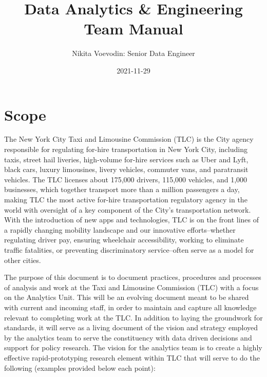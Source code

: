 \documentclass[
]{book}
\title{Data Analytics \& Engineering Team Manual}
\author{Nikita Voevodin: Senior Data Engineer}
\date{2021-11-29}
\begin{document}
\maketitle

{
\setcounter{tocdepth}{1}
\tableofcontents
}
\hypertarget{scope}{%
\chapter{Scope}\label{scope}}

The New York City Taxi and Limousine Commission (TLC) is the City agency responsible for regulating for-hire transportation in New York City, including taxis, street hail liveries, high-volume for-hire services such as Uber and Lyft, black cars, luxury limousines, livery vehicles, commuter vans, and paratransit vehicles. The TLC licenses about 175,000 drivers, 115,000 vehicles, and 1,000 businesses, which together transport more than a million passengers a day, making TLC the most active for-hire transportation regulatory agency in the world with oversight of a key component of the City's transportation network. With the introduction of new apps and technologies, TLC is on the front lines of a rapidly changing mobility landscape and our innovative efforts--whether regulating driver pay, ensuring wheelchair accessibility, working to eliminate traffic fatalities, or preventing discriminatory service--often serve as a model for other cities.

The purpose of this document is to document practices, procedures and processes of analysis and work at the Taxi and Limousine Commission (TLC) with a focus on the Analytics Unit. This will be an evolving document meant to be shared with current and incoming staff, in order to maintain and capture all knowledge relevant to completing work at the TLC. In addition to laying the groundwork for standards, it will serve as a living document of the vision and strategy employed by the analytics team to serve the constituency with data driven decisions and support for policy research. The vision for the analytics team is to create a highly effective rapid-prototyping research element within TLC that will serve to do the following (examples provided below each point):
\end{document}

